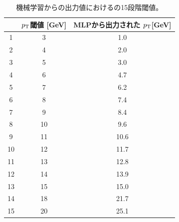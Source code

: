 \begin{table}[thb]
\centering
    \caption{機械学習からの出力値におけるの15段階閾値。}
    \label{Effective_number}
    \begin{tabular}{|c|c|c|}
        \hline
         & $p_{\rm{T}}$閾値 [GeV]&MLPから出力された $p_{\rm{T}}$[GeV]\\
        \hline
        1 & 3&1.0\\
        \hline
        2 & 4&2.0\\
        \hline
        3 & 5&3.0\\
        \hline
        4 & 6&4.7\\
        \hline
        5 & 7&6.2\\
        \hline
        6 & 8&7.4\\
        \hline
        7 & 9&8.4\\
        \hline
        8 & 10&9.6\\
        \hline
        9 & 11&10.6\\
        \hline
        10 & 12&11.7\\
        \hline
        11 & 13&12.8\\
        \hline
        12 & 14&13.9\\
        \hline
        13 & 15&15.0\\
        \hline
        14 & 18&21.7\\
        \hline
        15 & 20&25.1\\
        \hline
        
    \end{tabular}
\end{table}




